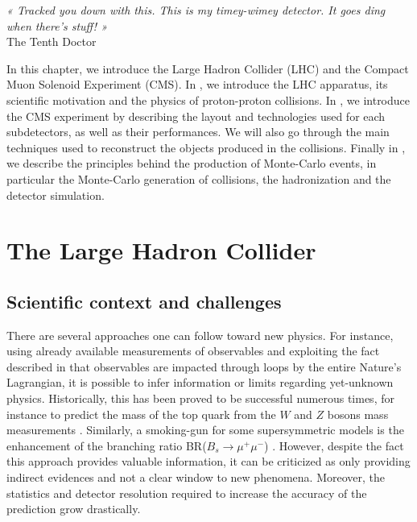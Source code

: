 \setcounter{mtc}{3}
\vspace*{-0.7cm}
\hspace*{0.39\textwidth}
\begin{minipage}{0.6\textwidth}
\emph{« Tracked you down with this. This is my timey-wimey detector. It goes ding when there’s stuff! »}\\
\hspace*{0.6\textwidth} The Tenth Doctor
\end{minipage}
\minitoc
\newpage

    In this chapter, we introduce the Large Hadron Collider (LHC) and the Compact Muon Solenoid
    Experiment (CMS). In , we introduce the LHC apparatus,
    its scientific motivation and the physics of proton-proton collisions. In ,
    we introduce the CMS experiment by describing the layout and technologies used for each
    subdetectors, as well as their performances. We will also go through the main techniques
    used to reconstruct the objects produced in the collisions. Finally in ,
    we describe the principles behind the production of Monte-Carlo events, in particular
    the Monte-Carlo generation of collisions, the hadronization and the detector simulation.

    \section{The Large Hadron Collider \label{sec:LHCintro}}

    \subsection{Scientific context and challenges}

    There are several approaches one can follow toward new physics. For instance, using already
    available measurements of observables and exploiting the fact described in
     that observables are impacted through loops by
    the entire Nature's Lagrangian, it is possible to infer information or limits regarding
    yet-unknown physics. Historically, this has been proved to be successful numerous times,
    for instance to predict the mass of the top quark from the $W$ and $Z$ bosons mass
    measurements \cite{discoveryOfTopQuark}. Similarly, a smoking-gun for some supersymmetric
    models is the enhancement of the branching ratio BR($B_s \rightarrow \mu^+\mu^-$)
    \cite{BsToMuMu}. However,
    despite the fact this approach provides valuable information, it can be criticized as
    only providing indirect evidences and not a clear window to new phenomena. Moreover,
    the statistics and detector resolution required to increase the accuracy of the
    prediction grow drastically.

